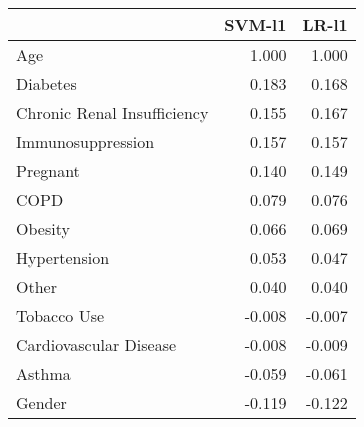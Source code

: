 \begin{tabular}{lrr}
\toprule
{} &  SVM-l1 &  LR-l1 \\
\midrule
Age                         &   1.000 &  1.000 \\
Diabetes                    &   0.183 &  0.168 \\
Chronic Renal Insufficiency &   0.155 &  0.167 \\
Immunosuppression           &   0.157 &  0.157 \\
Pregnant                    &   0.140 &  0.149 \\
COPD                        &   0.079 &  0.076 \\
Obesity                     &   0.066 &  0.069 \\
Hypertension                &   0.053 &  0.047 \\
Other                       &   0.040 &  0.040 \\
Tobacco Use                 &  -0.008 & -0.007 \\
Cardiovascular Disease      &  -0.008 & -0.009 \\
Asthma                      &  -0.059 & -0.061 \\
Gender                      &  -0.119 & -0.122 \\
\bottomrule
\end{tabular}
